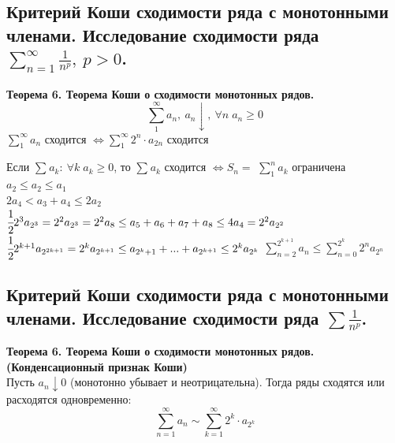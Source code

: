 \subsection{Критерий Коши сходимости ряда с монотонными членами. Исследование сходимости ряда $ \sum_{n = 1}^{\infty} \frac{1}{n^p},\ p > 0 $.}

\textbf{Теорема 6. Теорема Коши о сходимости монотонных рядов. }
\[\sum^{\infty}_{1} a_n,\ a_n \downarrow,\ \forall n\; a_n \geq 0\]
$ \sum^{\infty}_{1} a_n$ сходится $\Leftrightarrow \sum^{\infty}_{1} 2^n \cdot a_{2n}$ сходится

\begin{tcolorbox}
    Если $ \sum^{}_{} a_k:\ \forall k\; a_k \geq 0$, то $ \sum^{}_{} a_k$ сходится $\Leftrightarrow S_n=$ $ \sum^{n}_{1} a_k$ ограничена\\
    $ a_2 \leq a_2 \leq a_1 $\\
    $2a_4 < a_3 + a_4 \leq 2a_2 $\\
    $\cfrac{1}{2} 2^3 a_{2^3} = 2^2a_{2^3} = 2^2a_8 \leq a_5+a_6+a_7+a_8 \leq 4a_4 = 2^2 a_{2^2}$\\
    $\cfrac{1}{2}2^{k+1} a_{2^{2k+1}} = 2^ka_{2^{k+1}} \leq a_{2^k+1} + ... + a_{2^{k+1}} \leq 2^ka_{2^k}$
    $\sum^{2^{k+1}}_{n=2} a_n \leq \sum^{2^{k}}_{n=0} 2^n a_{2^n}$
\end{tcolorbox}

\subsection{Критерий Коши сходимости ряда с монотонными членами. Исследование сходимости ряда $\sum \frac{1}{n^p}$.}

\textbf{Теорема 6. Теорема Коши о сходимости монотонных рядов. (Конденсационный признак Коши)} \\
Пусть $a_n \downarrow 0$ (монотонно убывает и неотрицательна). Тогда ряды сходятся или расходятся одновременно:
\[ \sum^{\infty}_{n=1} a_n \sim \sum^{\infty}_{k=1} 2^k \cdot a_{2^k} \]


